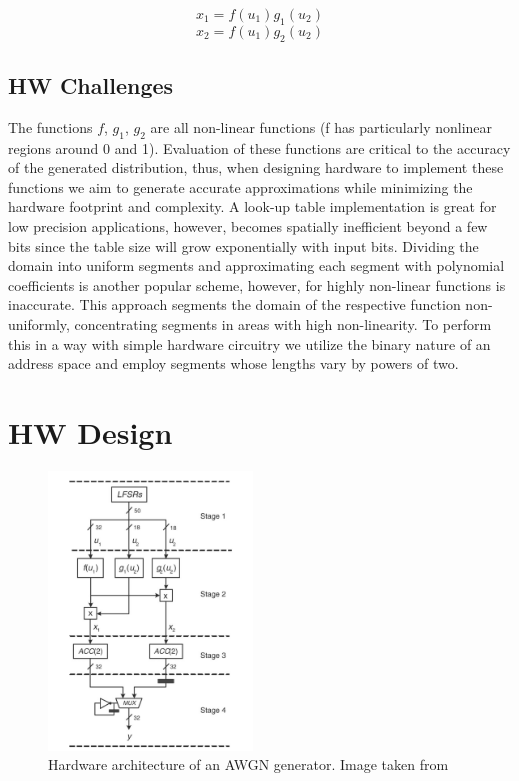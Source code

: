 $$x_1=f(u_1)g_1(u_2)$$
$$x_2=f(u_1)g_2(u_2)$$



\subsection{HW Challenges}
The functions $f$, $g_1$, $g_2$ are all non-linear functions (f has particularly nonlinear regions around 0 and 1). Evaluation of these functions are critical to the accuracy of the generated distribution, thus, when designing hardware to implement these functions we aim to generate accurate approximations while minimizing the hardware footprint and complexity. A look-up table implementation is great for low precision applications, however, becomes spatially inefficient beyond a few bits since the table size will grow exponentially with input bits. Dividing the domain into uniform segments and approximating each segment with polynomial coefficients is another popular scheme, however, for highly non-linear functions is inaccurate. This approach segments the domain of the respective function non-uniformly, concentrating segments in areas with high non-linearity. To perform this in a way with simple hardware circuitry we utilize the binary nature of an address space and employ segments whose lengths vary by powers of two. 

\section{HW Design}

\begin{figure}
\centering\CaptionFontSize
\includegraphics[height=20em]
{Figures/noise_gen_architecture.png}
\caption[Hardware architecture of an AWGN generator]
{Hardware architecture of an AWGN generator. Image taken from \cite{noise_gen}}
\label{Figure:NoiseGeneration:NoiseGenArchitecture}
\end{figure}

